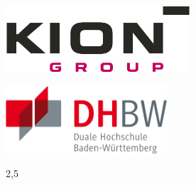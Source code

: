 \begin{titlepage}
    \begin{minipage}[t][2.5cm]{0.4\linewidth}
        \raggedright
        \includegraphics[height=2.5cm]{images/company}
    \end{minipage}
    \hfill
    \begin{minipage}[t][2.5cm]{0.4\linewidth}
        \raggedleft
        \includegraphics[height=2.5cm]{images/dhbw}
    \end{minipage}

    \begin{center}
        \vspace{0.5cm}
        \begin{spacing}{2,5}
        {\huge\textbf \mytitle }
            \\
        \end{spacing}

        \vspace*{15mm}
        {\LARGE\textbf \mythesis }\\
        \myphase\\

        \vspace*{10mm}
        \langfromthecourseofstudies\ \mycourse\\

        \vspace*{5mm}
        \langatdhbw\ \mydhbw\\
        \langcampus\ \mycampus\\

        \vspace*{15mm}
        \langby\\

        \vspace*{5mm}
        {\large\textbf \myauthor}\\

        \vspace*{10mm}
        \mysubmissionDate\\
    \end{center}


\end{titlepage}
